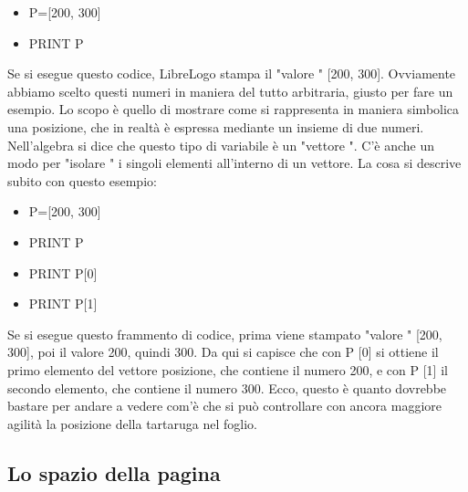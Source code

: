\vskip 1cm

\begin{scriptsize}
\begin{minipage}{0.40\textwidth}
\begin{itemize}[itemsep=-3pt,parsep=2pt]
\item[] P=[200, 300]
\item[] PRINT P
\end{itemize}
\end{minipage}
\end{scriptsize}

\vskip 1cm

Se si esegue questo codice, LibreLogo stampa il  "valore " [200, 300]. Ovviamente abbiamo scelto questi numeri in maniera del tutto arbitraria, giusto per fare un esempio. Lo scopo è quello di mostrare come si rappresenta in maniera simbolica una posizione, che in realtà è espressa mediante un insieme di due numeri. Nell'algebra si dice che questo tipo di variabile è un  "vettore ". C'è anche un modo per  "isolare " i singoli elementi all'interno di un vettore. La cosa si descrive subito con questo esempio:

\vskip 1cm

\begin{scriptsize}
\begin{minipage}{0.40\textwidth}
\begin{itemize}[itemsep=-3pt,parsep=2pt]
\item[] P=[200, 300]
\item[] PRINT P
\item[] PRINT P[0]
\item[] PRINT P[1]
\end{itemize}
\end{minipage}
\end{scriptsize}

\vskip 1cm

Se si esegue questo frammento di codice, prima viene stampato  "valore " [200, 300], poi il valore 200, quindi 300. Da qui si capisce che con P [0] si ottiene il primo elemento del vettore posizione, che contiene il numero 200, e con P [1] il secondo elemento, che contiene il numero 300.
Ecco, questo è quanto dovrebbe bastare per andare a vedere com'è che si può controllare con ancora maggiore agilità la posizione della tartaruga nel foglio. 

\subsection{Lo spazio della pagina} \label{se:spazio-pagina}

